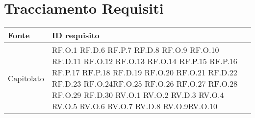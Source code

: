 \section{Tracciamento Requisiti}

    \begin{longtable}{|C{3.0cm}|C{3.0cm}|}
        \hline
         \textbf{Fonte} &
         \textbf{ID requisito}   
          \\
          \hline
          Capitolato & RF.O.1  \newline RF.D.6 \newline   
                        RF.P.7 \newline  RF.D.8 \newline
                        RF.O.9  \newline RF.O.10 \newline
                        RF.D.11   \newline      RF.O.12 \newline
                        RF.O.13  \newline       RF.O.14 \newline
                        RF.P.15  \newline        RF.P.16 \newline
                        RF.P.17  \newline        RF.P.18 \newline
                        RF.D.19   \newline      RF.O.20 \newline
RF.O.21 \newline RF.D.22 \newline RF.D.23  \newline  RF.O.24\newline RF.O.25 \newline
RF.O.26 \newline RF.O.27  \newline RF.O.28  \newline  RF.O.29 \newline RF.D.30 \newline
RV.O.1 \newline RV.O.2  \newline RV.D.3   \newline  RV.O.4   \newline RV.O.5 \newline
RV.O.6 \newline RV.O.7 \newline RV.D.8  \newline  RV.O.9\newline RV.O.10 \newline

\end{longtable}

